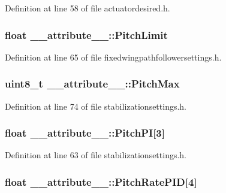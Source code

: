 \-Definition at line 58 of file actuatordesired.\-h.

\hypertarget{struct____attribute_____a676eaae4863b8f29f4f3c3258c963c9d}{
\subsubsection[{\-Pitch\-Limit}]{\setlength{\rightskip}{0pt plus 5cm}float {\bf \-\_\-\-\_\-attribute\-\_\-\-\_\-\-::\-Pitch\-Limit}}}\label{struct____attribute_____a676eaae4863b8f29f4f3c3258c963c9d}


\-Definition at line 65 of file fixedwingpathfollowersettings.\-h.

\hypertarget{struct____attribute_____aaf0599c6b7a11cf47c9681991f40b498}{
\subsubsection[{\-Pitch\-Max}]{\setlength{\rightskip}{0pt plus 5cm}uint8\-\_\-t {\bf \-\_\-\-\_\-attribute\-\_\-\-\_\-\-::\-Pitch\-Max}}}\label{struct____attribute_____aaf0599c6b7a11cf47c9681991f40b498}


\-Definition at line 74 of file stabilizationsettings.\-h.

\hypertarget{struct____attribute_____aa2e2546893e7aa2bc3f1516f040ec199}{
\subsubsection[{\-Pitch\-P\-I}]{\setlength{\rightskip}{0pt plus 5cm}float {\bf \-\_\-\-\_\-attribute\-\_\-\-\_\-\-::\-Pitch\-P\-I}\mbox{[}3\mbox{]}}}\label{struct____attribute_____aa2e2546893e7aa2bc3f1516f040ec199}


\-Definition at line 63 of file stabilizationsettings.\-h.

\hypertarget{struct____attribute_____a4a1866836affdf5713c3d03e3d2d71d9}{
\subsubsection[{\-Pitch\-Rate\-P\-I\-D}]{\setlength{\rightskip}{0pt plus 5cm}float {\bf \-\_\-\-\_\-attribute\-\_\-\-\_\-\-::\-Pitch\-Rate\-P\-I\-D}\mbox{[}4\mbox{]}}}\label{struct____attribute_____a4a1866836affdf5713c3d03e3d2d71d9}



